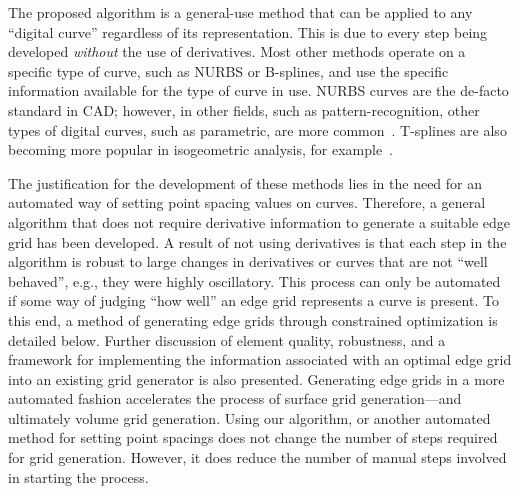 The proposed algorithm is a general-use method that can be applied to any ``digital curve'' regardless of its 
representation. This is due to every step being developed {\it without} the use of derivatives. Most other methods 
operate on a specific type of curve, such as NURBS or B-splines, and use the specific information available for 
the type of curve in use. NURBS curves are the de-facto standard in CAD; however, in other fields, such as 
pattern-recognition, other types of digital curves, such as parametric, are more 
common~\cite{interactive_curve_modeling}. T-splines are also becoming more popular in isogeometric 
analysis, for example~\cite{iga}. 

The justification for the development of these methods lies in the need 
for an automated way of setting point spacing values on curves. Therefore, 
a general algorithm that does not require derivative information to generate a suitable edge grid has been 
developed. A result of not using derivatives is that each step in the algorithm is robust to large changes in 
derivatives or curves that are not ``well behaved'', e.g., they were highly oscillatory. This process can only be 
automated if some way of judging ``how well'' an edge grid represents a curve is present. To this end, a method of 
generating edge grids through constrained optimization is detailed below. Further discussion of element quality, 
robustness, and a framework for implementing the information associated with an optimal edge grid into an existing 
grid generator is also presented. Generating edge grids in a more automated fashion accelerates the process of 
surface grid generation---and ultimately volume grid generation. Using our algorithm, or another automated method 
for setting point spacings does not change the number of steps required for grid generation. However, it does 
reduce the number of manual steps involved in starting the process.


